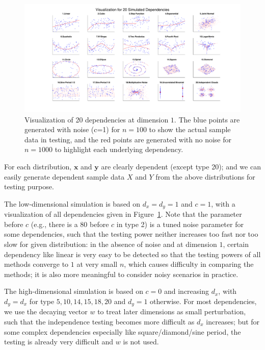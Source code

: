 \documentclass[11pt]{article}
\providecommand{\mb}[1]{\boldsymbol{#1}}
\begin{document}
\begin{figure}[htbp]
\includegraphics[trim={5cm 0 3.5cm 0},clip, width=1.0\textwidth]{../Figures/Fig0}
\caption{Visualization of 20 dependencies at dimension $1$. The blue points are generated with noise (c=1) for $n=100$ to show the actual sample data in testing, and the red points are generated with no noise for $n=1000$ to highlight each underlying dependency.
}
\label{fig0}
\end{figure}

For each distribution, $\mb{x}$ and $\mb{y}$ are clearly dependent (except type 20); and we can easily generate dependent sample data $X$ and $Y$ from the above distributions for testing purpose.

The low-dimensional simulation is based on $d_{x}=d_{y}=1$ and $c=1$, with a visualization of all dependencies given in Figure~\ref{fig0}. Note that the parameter before $c$ (e.g., there is a $80$ before $c$ in type 2) is a tuned noise parameter for some dependencies, such that the testing power neither increases too fast nor too slow for given distribution: in the absence of noise and at dimension $1$, certain dependency like linear is very easy to be detected so that the testing powers of all methods converge to $1$ at very small $n$, which causes difficulty in comparing the methods; it is also more meaningful to consider noisy scenarios in practice. 

The high-dimensional simulation is based on $c=0$ and increasing $d_{x}$, with $d_{y}=d_{x}$ for type $5,10,14,15,18,20$ and $d_{y}=1$ otherwise. For most dependencies, we use the decaying vector $w$ to treat later dimensions as small perturbation, such that the independence testing becomes more difficult as $d_{x}$ increases; but for some complex dependencies especially like square/diamond/sine period, the testing is already very difficult and $w$ is not used.
\end{document}
